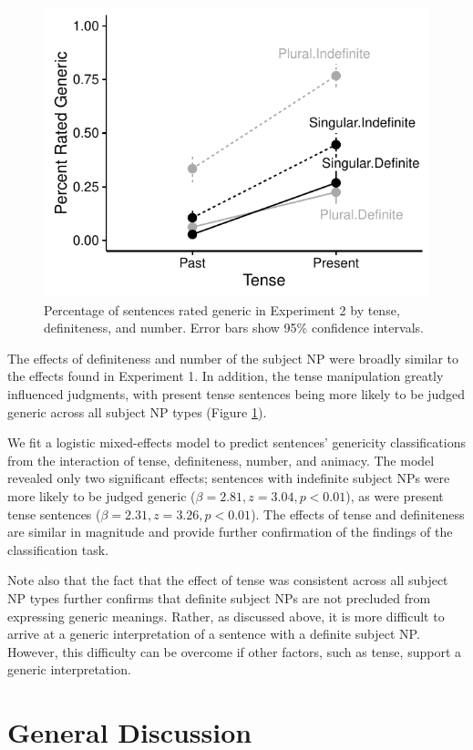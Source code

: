 \documentclass[10pt,letterpaper]{article}
\begin{document}
\begin{figure}[t]
\centering
\includegraphics[width=.8\linewidth]{figures/tense.pdf}
\caption{\label{fig:tense} Percentage of sentences rated generic in Experiment 2 by tense, definiteness, and number. Error bars show 95\% confidence intervals.}
\end{figure}

The effects of definiteness and number of the subject NP were broadly similar to the effects found in Experiment 1. In addition, the tense manipulation greatly influenced judgments, with present tense sentences being more likely to be judged generic across all subject NP types (Figure \ref{fig:tense}).

We fit a logistic mixed-effects model to predict sentences' genericity classifications from the interaction of tense, definiteness, number, and animacy. The model revealed only two significant effects; sentences with indefinite subject NPs were more likely to be judged generic (\(\beta = 2.81, z = 3.04, p < 0.01\)), as were present tense sentences (\(\beta = 2.31, z = 3.26, p < 0.01\)). The effects of tense and definiteness are similar in magnitude and provide further confirmation of the findings of the classification task.

Note also that the fact that the effect of tense was consistent across all subject NP types further confirms that definite subject NPs are not precluded from expressing generic meanings. Rather, as discussed above, it is more difficult to arrive at a generic interpretation of a sentence with a definite subject NP. However, this difficulty can be overcome if other factors, such as tense, support a generic interpretation.

\section{General Discussion}
\end{document}
